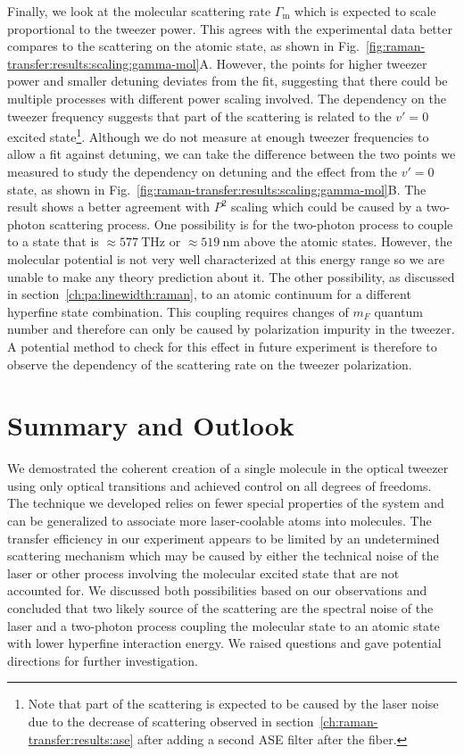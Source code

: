 Finally, we look at the molecular scattering rate $\Gamma_{\mathrm{m}}$
which is expected to scale proportional to the tweezer power.
This agrees with the experimental data better compares to the scattering on the atomic state,
as shown in Fig.~\ref{fig:raman-transfer:results:scaling:gamma-mol}A.
However, the points for higher tweezer power and smaller detuning deviates from the fit,
suggesting that there could be multiple processes with different power scaling involved.
The dependency on the tweezer frequency suggests that
part of the scattering is related to the $v'=0$ excited state\footnote{
  Note that part of the scattering is expected to be caused by the laser noise
  due to the decrease of scattering observed in section~\ref{ch:raman-transfer:results:ase}
  after adding a second ASE filter after the fiber.
}. Although we do not measure at enough tweezer frequencies to allow a fit against detuning,
we can take the difference between the two points we measured
to study the dependency on detuning and the effect from the $v'=0$ state,
as shown in Fig.~\ref{fig:raman-transfer:results:scaling:gamma-mol}B.
The result shows a better agreement with $P^2$ scaling
which could be caused by a two-photon scattering process.
One possibility is for the two-photon process to couple to a state
that is $\approx\!577~\mathrm{THz}$ or $\approx\!519~\mathrm{nm}$ above the atomic states.
However, the molecular potential is not very well characterized at this energy range
so we are unable to make any theory prediction about it.
The other possibility, as discussed in section~\ref{ch:pa:linewidth:raman},
to an atomic continuum for a different hyperfine state combination.
This coupling requires changes of $m_F$ quantum number
and therefore can only be caused by polarization impurity in the tweezer.
A potential method to check for this effect in future experiment
is therefore to observe the dependency of the scattering rate on the tweezer polarization.

\section{Summary and Outlook}
\label{ch:raman-transfer:summary}

We demostrated the coherent creation of a single molecule in the optical tweezer
using only optical transitions and achieved control on all degrees of freedoms.
The technique we developed relies on fewer special properties of the system
and can be generalized to associate more laser-coolable atoms into molecules.
The transfer efficiency in our experiment appears to be limited
by an undetermined scattering mechanism which may be caused by
either the technical noise of the laser
or other process involving the molecular excited state that are not accounted for.
We discussed both possibilities based on our observations
and concluded that two likely source of the scattering are the spectral noise of the laser
and a two-photon process coupling the molecular state to an atomic state
with lower hyperfine interaction energy.
We raised questions and gave potential directions for further investigation.

